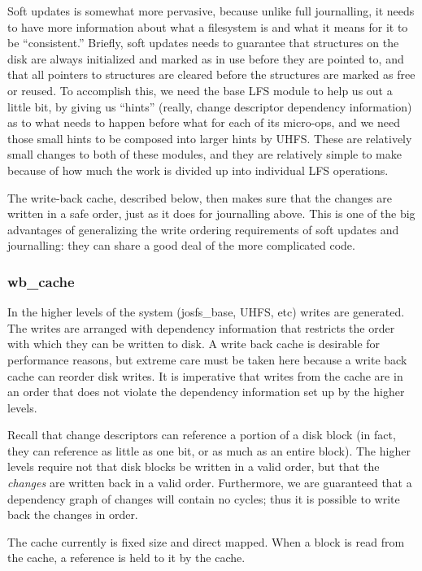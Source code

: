Soft updates is somewhat more pervasive, because unlike full journalling, it
needs to have more information about what a filesystem is and what it means for
it to be ``consistent.'' Briefly, soft updates needs to guarantee that
structures on the disk are always initialized and marked as in use before they
are pointed to, and that all pointers to structures are cleared before the
structures are marked as free or reused. To accomplish this, we need the base
LFS module to help us out a little bit, by giving us ``hints'' (really, change
descriptor dependency information) as to what needs to happen before what for
each of its micro-ops, and we need those small hints to be composed into larger
hints by UHFS. These are relatively small changes to both of these modules, and
they are relatively simple to make because of how much the work is divided up
into individual LFS operations.

The write-back cache, described below, then makes sure that the changes are
written in a safe order, just as it does for journalling above. This is one of
the big advantages of generalizing the write ordering requirements of soft
updates and journalling: they can share a good deal of the more complicated
code.

\subsubsection{wb\_cache}
\label{sec:solution:impl:wbcache}

In the higher levels of the system (josfs\_base, UHFS, etc) writes are
generated. The writes are arranged with dependency information that restricts
the order with which they can be written to disk. A write back cache is
desirable for performance reasons, but extreme care must be taken here because a
write back cache can reorder disk writes. It is imperative that writes from the
cache are in an order that does not violate the dependency information set up by
the higher levels.

Recall that change descriptors can reference a portion of a disk block (in fact,
they can reference as little as one bit, or as much as an entire block). The
higher levels require not that disk blocks be written in a valid order, but that
the \emph{changes} are written back in a valid order. Furthermore, we are
guaranteed that a dependency graph of changes will contain no cycles; thus it is
possible to write back the changes in order.

The cache currently is fixed size and direct mapped. When a block is read from
the cache, a reference is held to it by the cache.


